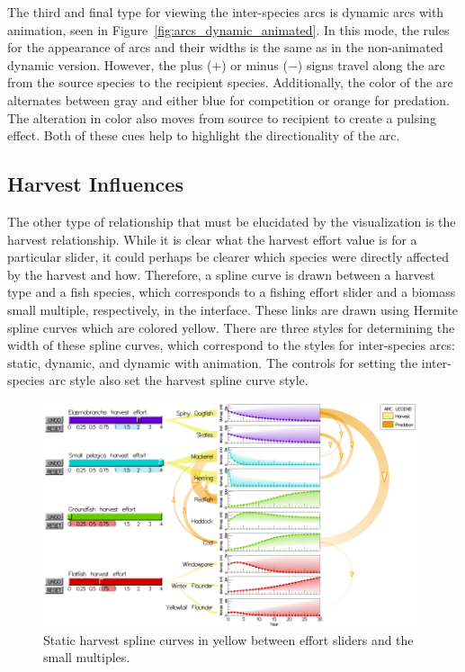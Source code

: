 The third and final type for viewing the inter-species arcs is dynamic arcs with animation, seen in Figure~\ref{fig:arcs_dynamic_animated}.  In this mode, the rules for the appearance of arcs and their widths is the same as in the non-animated dynamic version.  However, the plus ($+$) or minus ($-$) signs travel along the arc from the source species to the recipient species.  Additionally, the color of the arc alternates between gray and either blue for competition or orange for predation.  The alteration in color also moves from source to recipient to create a pulsing effect.  Both of these cues help to highlight the directionality of the arc.

\subsection{Harvest Influences}

The other type of relationship that must be elucidated by the visualization is the harvest relationship.  While it is clear what the harvest effort value is for a particular slider, it could perhaps be clearer which species were directly affected by the harvest and how.  Therefore, a spline curve is drawn between a harvest type and a fish species, which corresponds to a fishing effort slider and a biomass small multiple, respectively, in the interface.  These links are drawn using Hermite spline curves which are colored yellow.  There are three styles for determining the width of these spline curves, which correspond to the styles for inter-species arcs: static, dynamic, and dynamic with animation.  The controls for setting the inter-species arc style also set the harvest spline curve style.  

\begin{figure}[h]
	\centering
	\includegraphics[width=0.98\textwidth]{figures/png/harvest_splines.png}
	\caption[Static harvest spline curves in yellow between effort sliders and the small multiples]{Static harvest spline curves in yellow between effort sliders and the small multiples.}
	\label{fig:harvest_splines}
\end{figure}

